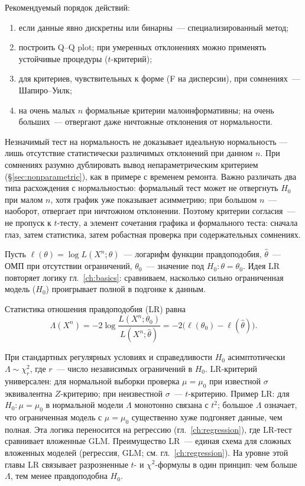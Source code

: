 Рекомендуемый порядок действий:
\begin{enumerate}
 \item если данные явно дискретны или бинарны~--- специализированный метод;
 \item построить Q--Q plot; при умеренных отклонениях можно применять
устойчивые процедуры ($t$-критерий);
 \item для критериев, чувствительных к форме (F на дисперсии), при сомнениях~---
Шапиро--Уилк;
 \item на очень малых $n$ формальные критерии малоинформативны;
 на очень больших~--- отвергают даже ничтожные отклонения от нормальности.
\end{enumerate}
Незначимый тест на нормальность не доказывает идеальную нормальность --- лишь отсутствие статистически различимых отклонений при данном $n$.
При сомнениях разумно дублировать вывод непараметрическим критерием (\S\ref{sec:nonparametric}), как в примере с временем ремонта.
Важно различать два типа расхождения с нормальностью: формальный тест может не отвергнуть $H_0$ при малом $n$, хотя график уже показывает асимметрию; при большом $n$~--- наоборот, отвергает при ничтожном отклонении. Поэтому критерии согласия~--- не пропуск к $t$-тесту, а элемент сочетания графика и формального теста: сначала глаз, затем статистика, затем робастная проверка при содержательных сомнениях.

Пусть $\ell(\theta)=\log L(X^n;\theta)$~--- логарифм функции правдоподобия, $\hat\theta$~--- ОМП при отсутствии ограничений, $\theta_0$~--- значение под $H_0\colon \theta=\theta_0$.
Идея LR повторяет логику гл.~\ref{ch:basics}: сравниваем, насколько сильно ограниченная модель ($H_0$) проигрывает полной в подгонке к данным.
\begin{definition}
Статистика отношения правдоподобия (LR) равна
\[
\Lambda(X^n)=-2\log\frac{L(X^n;\theta_0)}{L(X^n;\hat\theta)} =-2\bigl(\ell(\theta_0)-\ell(\hat\theta)\bigr).
\]
\end{definition}
При стандартных регулярных условиях и справедливости $H_0$ асимптотически $\Lambda\sim\chi^2_r$, где $r$~--- число независимых ограничений в $H_0$.
LR-критерий универсален: для нормальной выборки проверка $\mu=\mu_0$ при известной $\sigma$ эквивалентна $Z$-критерию; при неизвестной $\sigma$~--- $t$-критерию.
Пример LR: для $H_0\colon\mu=\mu_0$ в нормальной модели $\Lambda$ монотонно связана с $t^2$; большое $\Lambda$ означает, что ограниченная модель с $\mu=\mu_0$ существенно хуже подгоняет данные, чем полная. Эта логика переносится на регрессию (гл.~\ref{ch:regression}), где LR-тест сравнивает вложенные GLM.
Преимущество LR~--- единая схема для сложных вложенных моделей (регрессия, GLM; см. гл.~\ref{ch:regression}).
На уровне этой главы LR связывает разрозненные $t$- и $\chi^2$-формулы в один принцип: чем больше $\Lambda$, тем менее правдоподобна $H_0$.

